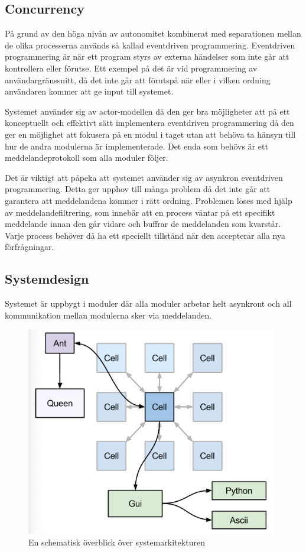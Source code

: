 \documentclass[12pt]{article}
\begin{document}
\subsection{Concurrency}
På grund av den höga nivån av autonomitet kombinerat med separationen mellan de olika processerna används så kallad eventdriven programmering.
Eventdriven programmering är när ett program styrs av externa händelser som inte går att kontrollera eller förutse.
Ett exempel på det är vid programmering av användargränssnitt,
då det inte går att förutspå när eller i vilken ordning användaren kommer att ge input till systemet.

Systemet använder sig av actor-modellen då den ger bra möjligheter att på ett konceptuellt och effektivt sätt implementera eventdriven programmering då den ger en möjlighet att fokusera på en modul i taget utan att behöva ta hänsyn till hur de andra modulerna är implementerade.
Det enda som behövs är ett meddelandeprotokoll som alla moduler följer.

Det är viktigt att påpeka att systemet använder sig av asynkron eventdriven programmering.
Detta ger upphov till många problem då det inte går att garantera att meddelandena kommer i rätt ordning.
Problemen löses med hjälp av meddelandefiltrering,
som innebär att en process väntar på ett specifikt meddelande innan den går vidare och buffrar de meddelanden som kvarstår.
Varje process behöver då ha ett speciellt tillstånd när den accepterar alla nya förfrågningar.

\subsection{Systemdesign}
Systemet är uppbygt i moduler där alla moduler arbetar helt asynkront och all kommunikation mellan modulerna sker via meddelanden.

\begin{figure}[H]
    \centering
    \includegraphics[width=\textwidth]{BugsLife-Fig2.png}
    \caption{En schematisk överblick över systemarkitekturen}\label{fig:sysark-overview}
\end{figure}
\end{document}
